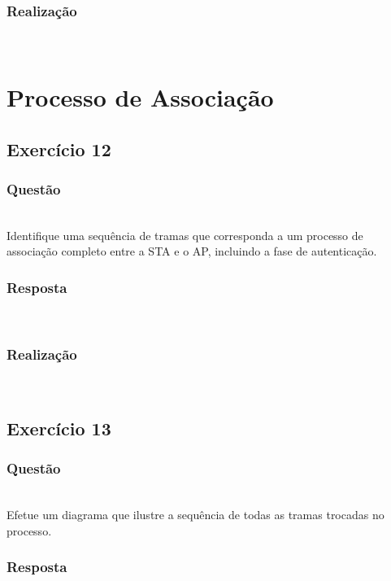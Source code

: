 \documentclass{llncs}
\begin{document}
\subsubsection{Realização}\rule[-10pt]{0pt}{10pt}\\



\clearpage

\section{Processo de Associação}
\subsection{Exercício 12}
\subsubsection{Questão}\rule[-10pt]{0pt}{10pt}\\

Identifique uma sequência de tramas que corresponda a um processo de associação completo entre a STA e o AP, incluindo a fase de autenticação.

\subsubsection{Resposta}\rule[-10pt]{0pt}{10pt}\\



\subsubsection{Realização}\rule[-10pt]{0pt}{10pt}\\



\clearpage
\subsection{Exercício 13}
\subsubsection{Questão}\rule[-10pt]{0pt}{10pt}\\

Efetue um diagrama que ilustre a sequência de todas as tramas trocadas no processo.

\subsubsection{Resposta}\rule[-10pt]{0pt}{10pt}\\
\end{document}
